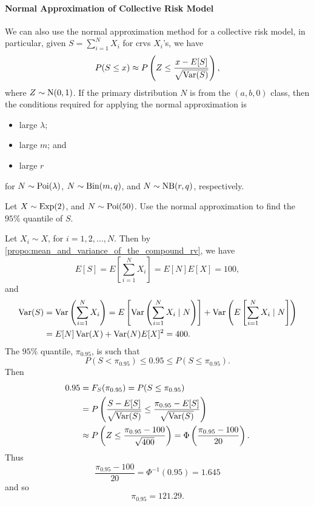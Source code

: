 \documentclass[notoc,notitlepage]{tufte-book}
\begin{document}
\paragraph{Normal Approximation of Collective Risk Model} We can also use the normal approximation method for a collective risk model, in particular, given $S = \sum_{i=1}^{N} X_i$ for crvs $X_i$'s, we have
\begin{equation*}
  P(S \leq x) \approx P \left( Z \leq \frac{x - E [S]}{\sqrt{\operatorname{Var}( S )}} \right),
\end{equation*}
where $Z \sim \operatorname{N}(0, 1)$. If the primary distribution $N$ is from the $(a, b, 0)$ class, then the conditions required for applying the normal approximation is
\begin{itemize}
  \item large $\lambda$;
  \item large $m$; and
  \item large $r$
\end{itemize}
for $N \sim \operatorname{Poi}(\lambda)$, $N \sim \operatorname{Bin}(m ,q)$, and $N \sim \operatorname{NB}(r, q)$, respectively.

\begin{eg}
  Let $X \sim \operatorname{Exp}(2)$, and $N \sim \operatorname{Poi}(50)$. Use the normal approximation to find the $95\%$ quantile of $S$.
\end{eg}

\begin{solution}
  Let $X_i \sim X$, for $i = 1, 2, \ldots, N$. Then by \cref{propo:mean_and_variance_of_the_compound_rv}, we have
  \begin{equation*}
    E [S] = E \left[ \sum_{i=1}^{N} X_i \right] = E[N] E[X] = 100,
  \end{equation*}
  and
  \begin{align*}
    \operatorname{Var}(S) &= \operatorname{Var} \left( \sum_{i=1}^{N} X_i \right) = E \left[ \operatorname{Var} \left( \sum_{i=1}^{N} X_i \mid N \right) \right] + \operatorname{Var} \left( E \left[ \sum_{i=1}^{N} X_i \mid N \right] \right) \\
            &= E[N] \operatorname{Var}(X) + \operatorname{Var}(N) E[X]^2 = 400.
  \end{align*}
  The $95\%$ quantile, $\pi_{0.95}$, is such that
  \begin{equation*}
    P( S < \pi_{0.95} ) \leq 0.95 \leq P ( S \leq \pi_{0.95} ).
  \end{equation*}
  Then
  \begin{align*}
    0.95 &= F_S( \pi_{0.95} ) = P (S \leq \pi_{0.95}) \\
         &= P \left( \frac{S - E[S]}{\sqrt{\operatorname{Var}(S)}} \leq \frac{\pi_{0.95} - E[S]}{\sqrt{\operatorname{Var}(S)}} \right) \\
         &\approx P \left( Z \leq \frac{\pi_{0.95} - 100}{\sqrt{400}} \right) = \Phi \left( \frac{\pi_{0.95} - 100}{20} \right).
  \end{align*}
  Thus
  \begin{equation*}
    \frac{\pi_{0.95} - 100}{20} = \Phi^{-1}(0.95) = 1.645
  \end{equation*}
  and so
  \begin{equation*}
    \pi_{0.95} = 121.29.
  \end{equation*}
\end{solution}
\end{document}
